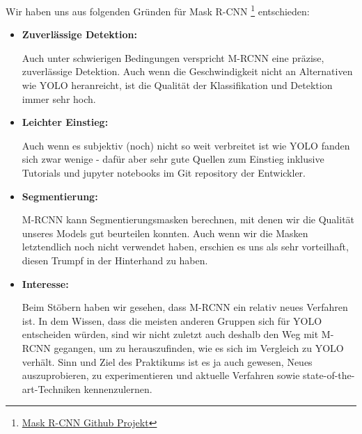 Wir haben uns aus folgenden Gründen für Mask R-CNN \footnote{\href{https://github.com/matterport/Mask_RCNN}{Mask R-CNN Github Projekt}} entschieden:
\begin{itemize}
	\item \textbf{Zuverlässige Detektion:}

Auch unter schwierigen Bedingungen verspricht M-RCNN eine präzise, zuverlässige Detektion. Auch wenn die Geschwindigkeit nicht an Alternativen wie YOLO heranreicht, ist die Qualität der Klassifikation und Detektion immer sehr hoch.
	\item \textbf{Leichter Einstieg:}

Auch wenn es subjektiv (noch) nicht so weit verbreitet ist wie YOLO fanden sich zwar wenige - dafür aber sehr gute Quellen zum Einstieg inklusive Tutorials und jupyter notebooks im Git repository der Entwickler.
	\item \textbf{Segmentierung:}

M-RCNN kann Segmentierungsmasken berechnen, mit denen wir die Qualität unseres Models gut beurteilen konnten.
Auch wenn wir die Masken letztendlich noch nicht verwendet haben, erschien es uns als sehr vorteilhaft, diesen Trumpf in der Hinterhand zu haben.
	\item \textbf{Interesse:}

Beim Stöbern haben wir gesehen, dass M-RCNN ein relativ neues Verfahren ist.
In dem Wissen, dass die meisten anderen Gruppen sich für YOLO entscheiden würden, sind wir nicht zuletzt auch deshalb den Weg mit M-RCNN gegangen, um zu herauszufinden, wie es sich im Vergleich zu YOLO verhält. Sinn und Ziel des Praktikums ist es ja auch gewesen, Neues auszuprobieren, zu experimentieren und aktuelle Verfahren sowie state-of-the-art-Techniken kennenzulernen.

\end{itemize}
